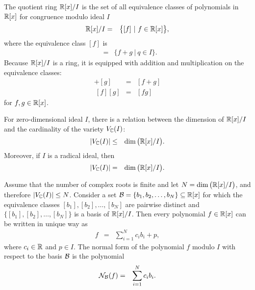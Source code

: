 The quotient ring $\mathbb{R}[x]/I$ is the set of all equivalence classes of polynomials in $\mathbb{R}[x]$ for congruence modulo ideal $I$
\begin{eqnarray}
  \mathbb{R}[x]/I &=& \big\{[f]\ |\ f\in\mathbb{R}[x]\big\},
\end{eqnarray}
where the equivalence class $[f]$ is
\begin{eqnarray}
  [f] &=& \big\{f+g\ |\ q\in I\big\}.
\end{eqnarray}
Because $\mathbb{R}[x]/I$ is a ring, it is equipped with addition and multiplication on the equivalence classes:
\begin{eqnarray}
  [f] + [g] &=& [f + g]\\
  ~[f][g] &=& [fg]
\end{eqnarray}
for $f, g\in\mathbb{R}[x]$.

For zero-dimensional ideal $I$, there is a relation between the dimension of $\mathbb{R}[x]/I$ and the cardinality of the variety $V_{\mathbb{C}}(I)$:
\begin{eqnarray}
  |V_{\mathbb{C}}(I)| &\leq& \dim\big(\mathbb{R}[x]/I\big).
\end{eqnarray}
Moreover, if $I$ is a radical ideal, then
\begin{eqnarray}
  |V_{\mathbb{C}}(I)| &=& \dim\big(\mathbb{R}[x]/I\big).
\end{eqnarray}

Assume that the number of complex roots is finite and let $N = \dim\big(\mathbb{R}[x]/I\big)$, and therefore $|V_{\mathbb{C}}(I)|\leq N$.
Consider a set $\mathcal{B} = \{b_1, b_2, \ldots, b_N\} \subseteq \mathbb{R}[x]$ for which the equivalence classes $[b_1], [b_2], \ldots, [b_N]$ are pairwise distinct and $\big\{[b_1], [b_2], \ldots, [b_N]\big\}$ is a basis of $\mathbb{R}[x]/I$.
Then every polynomial $f\in\mathbb{R}[x]$ can be written in unique way as
\begin{eqnarray}
  f &=& \sum_{i=1}^Nc_ib_i + p,
\end{eqnarray}
where $c_i\in\mathbb{R}$ and $p\in I$.
The normal form of the polynomial $f$ modulo $I$ with respect to the basis $\mathcal{B}$ is the polynomial
\begin{eqnarray}
  \mathcal{N}_{\mathcal{B}}(f) &=& \sum_{i=1}^N c_ib_i.
\end{eqnarray}


